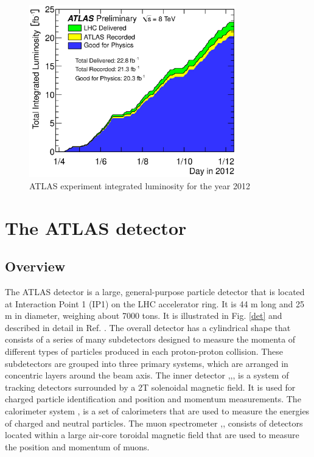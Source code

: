 \begin{figure}[H]
\begin{center}
\includegraphics[width=0.8\textwidth]{figs/lumi}
\caption{
ATLAS experiment integrated luminosity for the year 2012 \cite{lumi}
}
\label{intlumi}
\end{center}
\end{figure}




\section{The ATLAS detector}
\subsection{Overview}
The ATLAS detector is a large, general-purpose particle detector that is located at Interaction
Point 1 (IP1) on the LHC accelerator ring. It is 44 m long and 25 m in diameter,
weighing about 7000 tons. It is illustrated in Fig. \ref{det} and described in detail in Ref. \cite{atlasov1}.
The overall detector has a cylindrical shape that consists of a series of many subdetectors
designed to measure the momenta of different types of particles produced in each proton-proton collision. These subdetectors are grouped into three primary systems,
which are arranged in concentric layers around the beam axis. The inner detector \cite{atlasov2},\cite{atlasov3},\cite{atlasov4},\cite{atlasov5} is a system of tracking detectors surrounded by a 2T solenoidal magnetic field. It is used for charged particle identification and position and momentum measurements. The calorimeter system \cite{atlasov6},\cite{atlasov7} is a set of calorimeters that are used to measure the energies of charged and neutral particles. The muon spectrometer \cite{atlasov8},\cite{atlasov9},\cite{atlasov10}  consists of detectors located within a large air-core toroidal magnetic field that are used to measure the position and momentum of muons.

